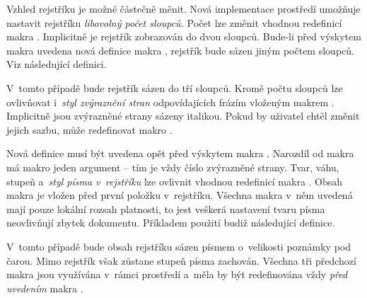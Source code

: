 \documentclass[12pt]{article}
\begin{document}
Vzhled rejstříku je možné částečně měnit. Nová implementace prostředí 
 umožňuje nastavit rejstříku \emph{libovolný počet sloupců.}
Počet lze změnit vhodnou redefinicí makra . Implicitně
je rejstřík zobrazován do dvou sloupců. Bude-li před výskytem makra
 uvedena nová definice makra ,
rejstřík bude sázen jiným počtem sloupců. Viz následující definici.
\begin{flushleft}
\end{flushleft}
V~tomto případě bude rejstřík sázen do tří sloupců. Kromě počtu sloupců lze
ovlivňovat i~\emph{styl zvýraznění stran}
odpovídajících frázím vloženým makrem . 
Implicitně jsou zvýrazněné strany sázeny italikou. 
Pokud by uživatel chtěl změnit jejich sazbu, 
může redefinovat makro .
\begin{flushleft}
\end{flushleft}
Nová definice musí být uvedena opět před výskytem makra .
Narozdíl od makra  má makro  jeden
argument -- tím je vždy číslo zvýrazněné strany. Tvar, váhu, stupeň 
a~\emph{styl písma v~rejstříku} lze ovlivnit vhodnou redefinicí makra
. Obsah makra je vložen před první položku v~rejstříku.
Všechna makra v~něm uvedená mají pouze lokální rozsah platnosti, to jest
veškerá nastavení tvaru písma neovlivňují zbytek dokumentu. 
Příkladem použití budiž následující definice.
\begin{flushleft}
\end{flushleft}
V~tomto případě bude obsah rejstříku sázen písmem o~velikosti poznámky
pod čarou. Mimo rejstřík však zůstane stupeň písma zachován.
Všechna tři předchozí makra jsou využívána v~rámci prostředí 
a~měla by být redefinována vždy \emph{před uvedením} 
makra .
\end{document}
